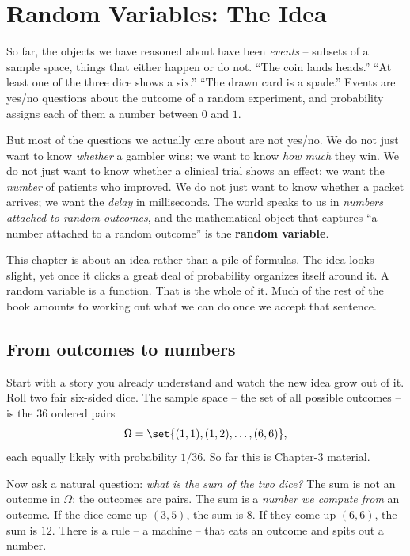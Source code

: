\chapter{Random Variables: The Idea}

So far, the objects we have reasoned about have been \emph{events} -- subsets of a
sample space, things that either happen or do not. ``The coin lands heads.'' ``At
least one of the three dice shows a six.'' ``The drawn card is a spade.'' Events are
yes/no questions about the outcome of a random experiment, and probability assigns
each of them a number between $0$ and $1$.

But most of the questions we actually care about are not yes/no. We do not just want
to know \emph{whether} a gambler wins; we want to know \emph{how much} they win. We
do not just want to know whether a clinical trial shows an effect; we want the
\emph{number} of patients who improved. We do not just want to know whether a packet
arrives; we want the \emph{delay} in milliseconds. The world speaks to us in
\emph{numbers attached to random outcomes}, and the mathematical object that captures
``a number attached to a random outcome'' is the \textbf{random variable}.

This chapter is about an idea rather than a pile of formulas. The idea looks slight,
yet once it clicks a great deal of probability organizes itself around it. A random
variable is a function. That is the whole of it. Much of the rest of the book amounts
to working out what we can do once we accept that sentence.

\section{From outcomes to numbers}
\label{ch06:outcomes-to-numbers}

Start with a story you already understand and watch the new idea grow out of
it. Roll two fair six-sided dice. The sample space -- the set of all possible
outcomes -- is the $36$ ordered pairs
\[
  \Omega = \set{(1,1),(1,2),\dots,(6,6)},
\]
each equally likely with probability $1/36$. So far this is Chapter-3 material.

Now ask a natural question: \emph{what is the sum of the two dice?} The sum is not an
outcome in $\Omega$; the outcomes are pairs. The sum is a \emph{number we compute from}
an outcome. If the dice come up $(3,5)$, the sum is $8$. If they come up $(6,6)$, the
sum is $12$. There is a rule -- a machine -- that eats an outcome and spits out a
number.

